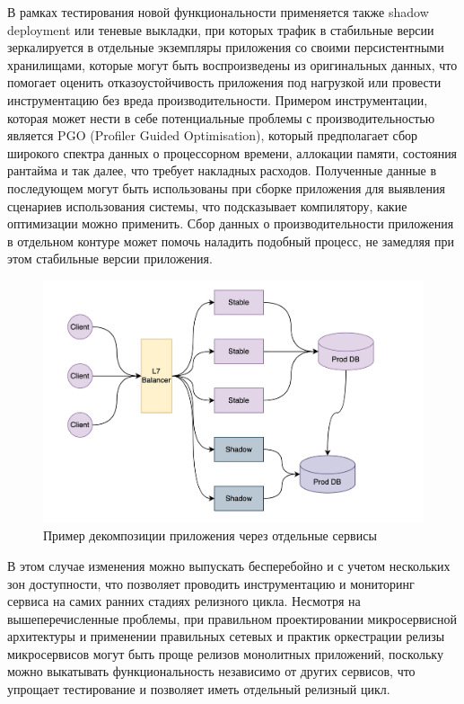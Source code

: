 В рамках тестирования новой функциональности применяется также shadow deployment или теневые выкладки,
при которых трафик в стабильные версии зеркалируется в отдельные экземпляры приложения со своими персистентными хранилищами,
которые могут быть воспроизведены из оригинальных данных, что помогает оценить отказоустойчивость
приложения под нагрузкой или провести инструментацию без вреда производительности.
Примером инструментации, которая может нести в себе потенциальные проблемы с производительностью
является PGO (Profiler Guided Optimisation), который предполагает сбор широкого спектра данных о
процессорном времени, аллокации памяти, состояния рантайма и так далее, что требует накладных расходов.
Полученные данные в последующем могут быть использованы при сборке приложения для выявления сценариев
использования системы, что подсказывает компилятору, какие оптимизации можно применить.
Сбор данных о производительности приложения в отдельном контуре может помочь наладить подобный процесс, не замедляя
при этом стабильные версии приложения.
\begin{figure}[H]
    \centering
    \includegraphics[width=0.8\linewidth]{img/shadow.jpg}
    \caption{Пример декомпозиции приложения через отдельные сервисы}
    \label{fig:y}
\end{figure}

В этом случае изменения можно выпускать бесперебойно и с учетом нескольких зон
доступности, что позволяет проводить инструментацию и мониторинг сервиса на самих ранних стадиях релизного цикла.
Несмотря на вышеперечисленные проблемы, при правильном проектировании микросервисной архитектуры и применении правильных сетевых и практик оркестрации 
релизы микросервисов могут быть проще релизов монолитных приложений, поскольку можно выкатывать функциональность независимо от других 
сервисов, что упрощает тестирование и позволяет иметь отдельный релизный цикл.

